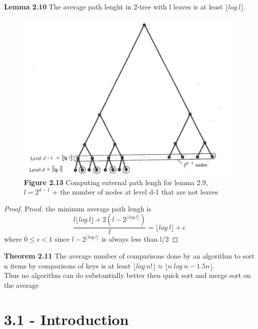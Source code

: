 \documentclass[a4paper,10pt,titlepage]{report}
\begin{document}
\textbf{Lemma 2.10} The average path lenght in 2-tree with l leaves is at least $\lfloor log \ l \rfloor$.\\

\begin{figure}[h]
\includegraphics[scale=0.3]{notes_2_13.png}
\caption{\textbf{Figure 2.13} Computing external path lengh for lemma 2.9, $l = 2^{d-1}$ + the number of nodes at level d-1 that are not leaves}
\end{figure}

\begin{proof}
Proof. the minimun average path lengh is 
\begin{equation}
\frac{l \lfloor log \ l \rfloor +2(l-2^{\lfloor log \ l \rfloor})}{l} = \lfloor log \ l \rfloor + \epsilon
\end{equation}
where $0 \leq \epsilon < 1 $ since $ l-2^{\lfloor log \ l \rfloor}$ is always less than l/2
\end{proof}
\vspace{5mm}
\textbf{Theorem 2.11} The average number of comparisons done by an algorithm to sort n items by comparisons of keys is at least $\lfloor log \ n! \rfloor \approx \lfloor n \ log \ n - 1.5n \rfloor$.\\
Thus no algorithm can do substantially better then quick sort and merge sort on the average


\section{3.1 - Introduction}
\end{document}
